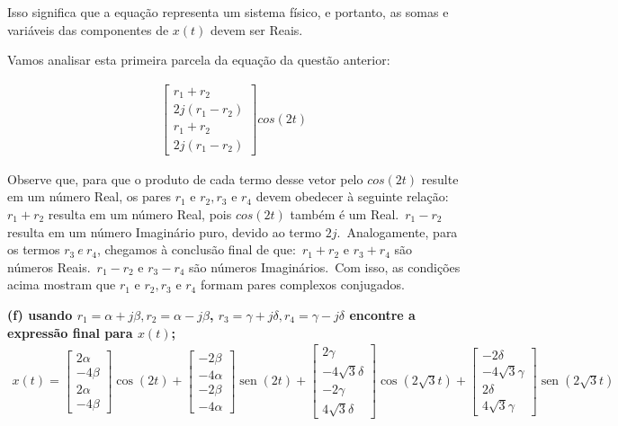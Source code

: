 \documentclass[11pt]{article}
\DeclareMathOperator{\sen}{sen}
\begin{document}
Isso significa que a equação representa um sistema físico, e portanto, as somas e variáveis das componentes de $x(t)$ devem ser Reais.

Vamos analisar esta primeira parcela da equação da questão anterior:

\begin{align*}
  \begin{bmatrix}
    r_1+r_2\\
    2j(r_1-r_2)\\
    r_1+r_2\\
    2j(r_1-r_2)
  \end{bmatrix}
  cos(2t)
\end{align*}

Observe que, para que o produto de cada termo desse vetor pelo $cos(2t)$ resulte em um número Real, os pares $r_1 \text{ e } r_2, r_3 \text{ e } r_4$ devem obedecer à seguinte relação:\
$r_1+r_2$ resulta em um número Real, pois $cos(2t)$ também é um Real.\
$r_1-r_2$ resulta em um número Imaginário puro, devido ao termo $2j$.\
Analogamente, para os termos $r_3\ e\ r_4$, chegamos à conclusão final de que:\
$r_1+r_2$ e $r_3+r_4$ são números Reais.\
$r_1-r_2$ e $r_3-r_4$ são números Imaginários.\
Com isso, as condições acima mostram que $r_1 \text{ e } r_2, r_3 \text{ e } r_4$ formam pares complexos conjugados.\

\textbf{(f) usando $r_1 = \alpha + j\beta, r_2 = \alpha - j\beta$, $r_3 = \gamma + j\delta, r_4 = \gamma - j\delta$ encontre a expressão final para $x(t)$;}
\begin{align*}
  x(t) =
  \begin{bmatrix}
    2\alpha\\
    -4\beta\\
    2\alpha\\
    -4\beta
  \end{bmatrix}
  \cos(2t) +
  \begin{bmatrix}
    -2\beta\\
    -4\alpha\\
    -2\beta\\
    -4\alpha
  \end{bmatrix}
  \sen(2t) +
  \begin{bmatrix}
    2\gamma\\
    -4\sqrt{3}\delta\\
    -2\gamma\\
    4\sqrt{3}\delta
  \end{bmatrix}
  \cos(2\sqrt{3}t) +
  \begin{bmatrix}
    -2\delta\\
    -4\sqrt{3}\gamma\\
    2\delta\\
    4\sqrt{3}\gamma
  \end{bmatrix}
  \sen(2\sqrt{3}t)
\end{align*}
\end{document}
